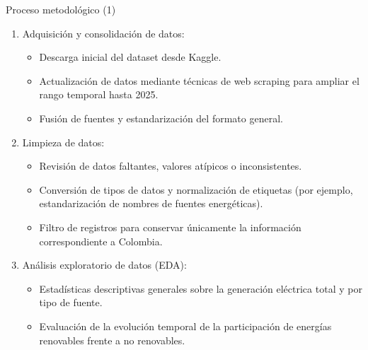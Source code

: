 \documentclass[10pt]{beamer}
\begin{document}
		\begin{frame}[fragile]{Proceso metodol\'ogico (1)}
		\begin{enumerate}
			\item Adquisición y consolidación de datos:
			\begin{itemize}
				\item Descarga inicial del dataset desde Kaggle.		
				\item Actualización de datos mediante técnicas de web scraping para ampliar el rango temporal hasta 2025.		
				\item Fusión de fuentes y estandarización del formato general.		
			\end{itemize}
			\item Limpieza de datos:
			\begin{itemize}
				\item Revisión de datos faltantes, valores atípicos o inconsistentes.
				\item Conversión de tipos de datos y normalización de etiquetas (por ejemplo, estandarización de nombres de fuentes energéticas).
				\item Filtro de registros para conservar únicamente la información correspondiente a Colombia.
			\end{itemize}
			\item Análisis exploratorio de datos (EDA):
			\begin{itemize}
				\item Estadísticas descriptivas generales sobre la generación eléctrica total y por tipo de fuente.		
				\item Evaluación de la evolución temporal de la participación de energías renovables frente a no renovables.
			\end{itemize}			
		\end{enumerate}
	\end{frame}
	
\end{document}

